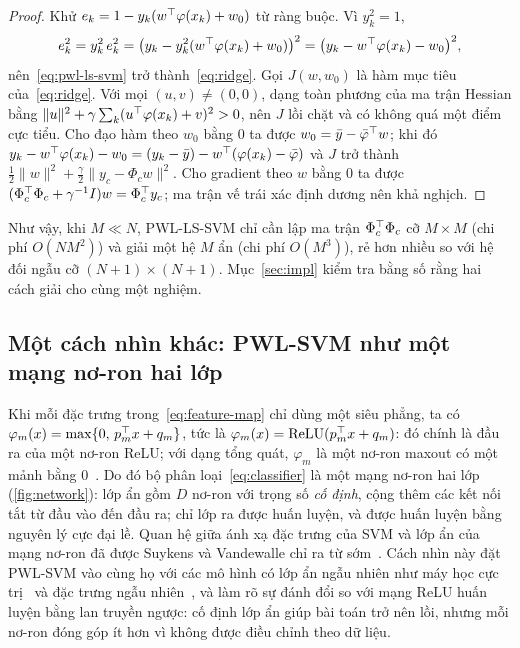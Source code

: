 \begin{proof}
Khử $e_k=1-y_k(w^\top\varphi(x_k)+w_0)$ từ ràng buộc. Vì $y_k^2=1$,
\[
e_k^2=y_k^2\,e_k^2=\bigl(y_k-y_k^2(w^\top\varphi(x_k)+w_0)\bigr)^2=\bigl(y_k-w^\top\varphi(x_k)-w_0\bigr)^2,
\]
nên~\eqref{eq:pwl-ls-svm} trở thành~\eqref{eq:ridge}. Gọi $J(w,w_0)$ là hàm mục tiêu của~\eqref{eq:ridge}. Với mọi $(u,v)\neq(0,0)$, dạng toàn phương của ma trận Hessian bằng $\|u\|^2+\gamma\sum_k(u^\top\varphi(x_k)+v)^2>0$, nên $J$ lồi chặt và có không quá một điểm cực tiểu. Cho đạo hàm theo $w_0$ bằng $0$ ta được $w_0=\bar y-\bar\varphi^\top w$; khi đó $y_k-w^\top\varphi(x_k)-w_0=(y_k-\bar y)-w^\top(\varphi(x_k)-\bar\varphi)$ và $J$ trở thành $\frac12\|w\|^2+\frac\gamma2\|y_c-\Phi_cw\|^2$. Cho gradient theo $w$ bằng $0$ ta được $(\Phi_c^\top\Phi_c+\gamma^{-1}I)w=\Phi_c^\top y_c$; ma trận vế trái xác định dương nên khả nghịch.
\end{proof}

Như vậy, khi $M\ll N$, PWL-LS-SVM chỉ cần lập ma trận $\Phi_c^\top\Phi_c$ cỡ $M\times M$ (chi phí $O(NM^2)$) và giải một hệ $M$ ẩn (chi phí $O(M^3)$), rẻ hơn nhiều so với hệ đối ngẫu cỡ $(N+1)\times(N+1)$. Mục~\ref{sec:impl} kiểm tra bằng số rằng hai cách giải cho cùng một nghiệm.

\subsection{Một cách nhìn khác: PWL-SVM như một mạng nơ-ron hai lớp}

Khi mỗi đặc trưng trong~\eqref{eq:feature-map} chỉ dùng một siêu phẳng, ta có $\varphi_m(x)=\max\{0,\,p_m^\top x+q_m\}$, tức là $\varphi_m(x)=\mathrm{ReLU}(p_m^\top x+q_m)$: đó chính là đầu ra của một nơ-ron ReLU; với dạng tổng quát, $\varphi_m$ là một nơ-ron maxout có một mảnh bằng $0$~\cite{goodfellow2013}. Do đó bộ phân loại~\eqref{eq:classifier} là một mạng nơ-ron hai lớp (\cref{fig:network}): lớp ẩn gồm $D$ nơ-ron với trọng số \emph{cố định}, cộng thêm các kết nối tắt từ đầu vào đến đầu ra; chỉ lớp ra được huấn luyện, và được huấn luyện bằng nguyên lý cực đại lề. Quan hệ giữa ánh xạ đặc trưng của SVM và lớp ẩn của mạng nơ-ron đã được Suykens và Vandewalle chỉ ra từ sớm~\cite{suykens1999mlp}. Cách nhìn này đặt PWL-SVM vào cùng họ với các mô hình có lớp ẩn ngẫu nhiên như máy học cực trị~\cite{huanggb2006} và đặc trưng ngẫu nhiên~\cite{rahimi2007}, và làm rõ sự đánh đổi so với mạng ReLU huấn luyện bằng lan truyền ngược: cố định lớp ẩn giúp bài toán trở nên lồi, nhưng mỗi nơ-ron đóng góp ít hơn vì không được điều chỉnh theo dữ liệu.

